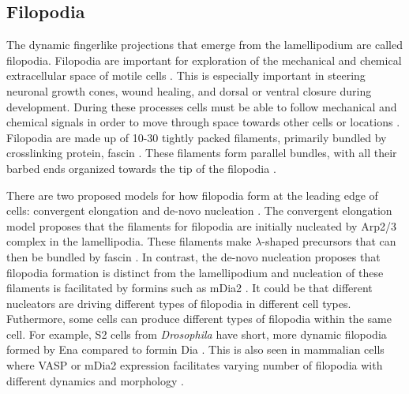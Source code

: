 \subsection{Filopodia}\label{filopodia-intro}
The dynamic fingerlike projections that emerge from the lamellipodium are called filopodia. Filopodia are important for exploration of the mechanical and chemical extracellular space of motile cells \citep{mattila_filopodia:_2008}. This is especially important in steering neuronal growth cones, wound healing, and dorsal or ventral closure during development. During these processes cells must be able to follow mechanical and chemical signals in order to move through space towards other cells or locations \citep{bornschlogl_how_2013}. Filopodia are made up of 10-30 tightly packed filaments, primarily bundled by crosslinking protein, fascin \citep{vignjevic_role_2006, mellor_role_2010}. These filaments form parallel bundles, with all their barbed ends organized towards the tip of the filopodia \citep{bornschlogl_how_2013}.

There are two proposed models for how filopodia form at the leading edge of cells: convergent elongation \citep{yang_filopodia_2011} and de-novo nucleation \citep{faix_filopodia:_2009}. The convergent elongation model proposes that the filaments for filopodia are initially nucleated by Arp2/3 complex in the lamellipodia. These filaments make $\lambda$-shaped precursors that can then be bundled by fascin \citep{svitkina_mechanism_2003,small_lamellipodium:_2002}. In contrast, the de-novo nucleation proposes that filopodia formation is distinct from the lamellipodium and nucleation of these filaments is facilitated by formins such as mDia2 \citep{faix_making_2006,mellor_role_2010}. It could be that different nucleators are driving different types of filopodia in different cell types. Futhermore, some cells can produce different types of filopodia within the same cell. For example, S2 cells from \textit{Drosophila} have short, more dynamic filopodia formed by Ena compared to formin Dia \citep{bilancia_enabled_2014}. This is also seen in mammalian cells where VASP or mDia2 expression facilitates varying number of filopodia with different dynamics and morphology \citep{barzik_ena/vasp_2014}. 

